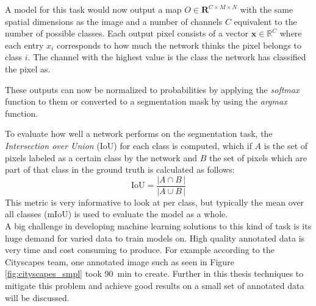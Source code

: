 A model for this task would now output a map $O\in\mathbf{R}^{C\times M\times N}$ with the same spatial dimensions as the image and a number of channels $C$ equivalent to the number of possible classes. Each output pixel consists of a vector $\mathbf{x}\in \mathbb{R}^C$ where each entry $x_i$ corresponds to how much the network thinks the pixel belongs to class $i$. The channel with the highest value is the class the network has classified the pixel as.

These outputs can now be normalized to probabilities by applying the \emph{softmax} function to them or converted to a segmentation mask by using the \emph{argmax} function.

To evaluate how well a network performs on the segmentation task, the \emph{Intersection over Union} (IoU) for each class is computed, which if $A$ is the set of pixels labeled as a certain class by the network and $B$ the set of pixels which are part of that class in the ground truth is calculated as follows:
$$
    \text{IoU} = \frac{\left|A\cap B \,\right|}{\left|A\cup B \,\right|}
$$
This metric is very informative to look at per class, but typically the mean over all classes (mIoU) is used to evaluate the model as a whole.\\

A big challenge in developing machine learning solutions to this kind of task is its huge demand for varied data to train models on. High quality annotated data is very time and cost consuming to produce. 
For example according to the Cityscapes team, one annotated image such as seen in Figure \ref{fig:cityscapes_smpl} took \SI{90}{min} to create. 
Further in this thesis techniques to mitigate this problem and achieve good results on a small set of annotated data will be discussed.
